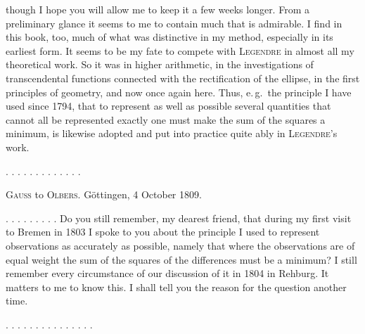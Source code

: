 though I hope you will allow me to keep it a few weeks longer. From a preliminary glance it seems to me to contain much that is admirable. I find in this book, too, much of what was distinctive in my method, especially in its earliest form. It seems to be my fate to compete with \textsc{Legendre} in almost all my theoretical work. So it was in higher arithmetic, in the investigations of transcendental functions connected with the rectification of the ellipse, in the first principles of geometry, and now once again here. Thus, e.\,g.\ the principle I have used since 1794, that to represent as well as possible several quantities that cannot all be represented exactly one must make the sum of the squares a minimum, is likewise adopted and put into practice quite ably in \textsc{Legendre}'s work.

\begin{center}
. . . . . . . . . . . . .
\end{center}

\begin{center}
\textsc{Gauss} to \textsc{Olbers}. Göttingen, 4 October 1809.
\end{center}

. . . . . . . . . Do you still remember, my dearest friend, that during my first visit to Bremen in 1803 I spoke to you about the principle I used to represent observations as accurately as possible, namely that where the observations are of equal weight the sum of the squares of the differences must be a minimum? I still remember every circumstance of our discussion of it in 1804 in Rehburg. It matters to me to know this. I shall tell you the reason for the question another time.

\begin{center}
. . . . . . . . . . . . . . .
\end{center}
